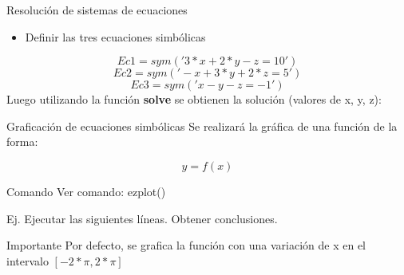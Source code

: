 \documentclass{bredelebeamer}
\begin{document}
\begin{frame}{Resolución de sistemas de ecuaciones}
\begin{itemize}
\item Definir las tres ecuaciones simbólicas
\end{itemize}
\begin{equation*}
Ec1 = sym('3*x+2*y-z=10')
\end{equation*}
\begin{equation*}
Ec2 = sym('-x+3*y+2*z=5')
\end{equation*}
\begin{equation*}
Ec3 = sym('x-y-z=-1')
\end{equation*}
Luego utilizando la función \textbf{solve} se obtienen la solución (valores de x, y, z):
\end{frame}

\begin{frame}{Graficación de ecuaciones simbólicas}
Se realizará la gráfica de una función de la forma:
\begin{center}
\begin{equation*}
y = f(x)
\end{equation*}
\end{center}
\begin{exampleblock}{Comando}
Ver comando: ezplot()
\end{exampleblock}
Ej. Ejecutar las siguientes líneas. Obtener conclusiones.
\begin{alertblock}{Importante}
Por defecto, se grafica la función con una variación de x en el intervalo $[-2*\pi ,2*\pi ]$
\end{alertblock}
\end{frame}
\end{document}

